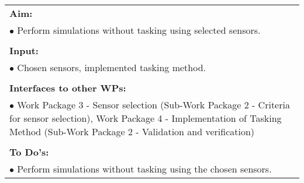 \begin{table}[!h]
\begin{center}
\begin{tabular}{|p{35mm}||p{55mm}|p{50mm}||p{40mm}|}
      \hline\hline
      \multicolumn{4}{|p{150mm}|}{\textbf{Aim:}}                                                                                                                                                            \\
      \multicolumn{4}{|p{150mm}|}{$\bullet$ Perform simulations without tasking using selected sensors.}                                                   \\
      \multicolumn{4}{|p{150mm}|}{}                                                                                                                                                                           \\
      \multicolumn{4}{|p{150mm}|}{\textbf{Input:}}                                                                                                                                                            \\
      \multicolumn{4}{|p{150mm}|}{$\bullet$ Chosen sensors, implemented tasking method.}                                                                                                                                 \\
      \multicolumn{4}{|p{150mm}|}{}                                                                                                                                                                           \\
      \multicolumn{4}{|p{150mm}|}{\textbf{Interfaces to other WPs:}}                                                                                                                                    \\
      \multicolumn{4}{|p{150mm}|}{$\bullet$ Work Package 3 - Sensor selection (Sub-Work Package 2 - Criteria for sensor selection), Work Package 4 - Implementation of Tasking Method (Sub-Work Package 2 - Validation and verification)}                                                                                              \\
      \multicolumn{4}{|p{150mm}|}{}                                                                                                                                                                           \\
      \multicolumn{4}{|p{150mm}|}{\textbf{To Do's:}}                                                                                                                                                         \\
      \multicolumn{4}{|p{150mm}|}{$\bullet$ Perform simulations without tasking using the chosen sensors.}\\

\end{tabular}
\end{center}
\end{table}
